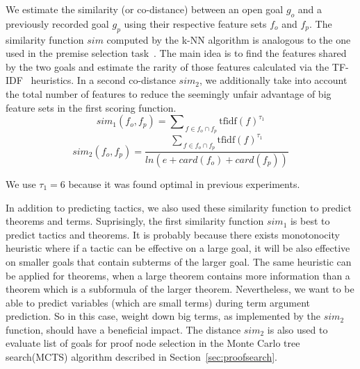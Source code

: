 \documentclass[runningheads,a4paper,draft]{svjour3}
\begin{document}
We estimate the similarity (or co-distance) between an open goal $g_o$ and a 
previously recorded goal $g_p$ using their respective feature sets $f_o$ and 
$f_p$.
The similarity function $sim$ computed by the k-NN algorithm is analogous 
to the
one used in the premise selection task~\cite{ckju-pxtp13}. The main idea 
is to find the features shared by the two goals and estimate the rarity of 
those features calculated via the TF-IDF~\cite{Jones72astatistical} heuristics.
In a second co-distance $sim_2$, we additionally take into account 
the
total number of 
features to reduce the seemingly unfair advantage of big feature sets in the 
first scoring function.
\[sim_1 (f_o, f_p) = {\sum\nolimits_{\,f \in f_o \cap 
f_p}{\text{tfidf}(f)^{\tau_1}}}\]
\[sim_2 (f_o, f_p) = \frac{{\sum\nolimits_{\,f \in f_o \cap 
f_p}{\text{tfidf}(f)^{\tau_1}}}}
{ln (e + card(f_o) + card(f_p))}
\]

\begin{remark}
We use $\tau_1 = 6$ because it was found optimal in previous experiments.
\end{remark}



In addition to predicting tactics, we also used these similarity function to 
predict theorems and terms. Suprisingly, the first similarity function $sim_1$
is best to predict tactics and theorems. It is probably because there exists 
monotonocity heuristic where if a tactic can be effective on a large goal, it 
will be also effective on smaller goals that contain subterms of the larger 
goal. The same heuristic can be applied for theorems, when a large theorem 
contains more information than a theorem which is a subformula of the larger 
theorem. Nevertheless, we want to be able to predict variables (which are small 
terms) during term argument prediction. So in this case, weight down big terms, 
as implemented by the $sim_2$ function, should have a beneficial impact.
The distance $sim_2$ is also used to evaluate list of goals for proof node 
selection in the Monte Carlo tree search(MCTS) algorithm described in 
Section~\ref{sec:proofsearch}.


\end{document}
